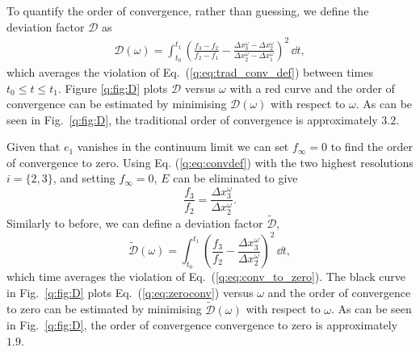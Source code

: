 To quantify the order of convergence, rather than guessing, we define the deviation factor $\mathcal{D}$ as
\begin{align}\label{q:eq:tradconv}
\mathcal{D}(\omega) = \int_{t_0}^{t_1}\left(\frac{f_3-f_2}{f_2-f_1} - \frac{ \Delta x_3^\omega-\Delta x_2^\omega }{ \Delta x_2^\omega-\Delta x_1^\omega }\right)^2\,\dd t,
\end{align}
which averages the violation of Eq.~(\ref{q:eq:trad_conv_def}) between times $t_0\leq t\leq t_1$. Figure \ref{q:fig:D} plots $\mathcal{D}$ versus $\omega$ with a red curve and the order of convergence can be estimated by minimising $\mathcal{D}(\omega)$ with respect to $\omega$. As can be seen in Fig.~\ref{q:fig:D}, the traditional order of convergence is approximately $3.2$.

Given that $e_1$ vanishes in the continuum limit we can set $f_\infty=0$ to find the order of convergence to zero. Using Eq. (\ref{q:eq:convdef}) with the two highest resolutions $i=\{2,3\}$, and setting $f_\infty=0$, $E$ can be eliminated to give
\begin{equation}\label{q:eq:conv_to_zero}
\frac{f_3}{f_2} = \frac{\Delta x_3^\omega}{\Delta x_2^\omega}.
\end{equation}
Similarly to before, we can define a deviation factor $\tilde{\mathcal{D}}$,
\begin{equation}\label{q:eq:zeroconv}
\tilde{\mathcal{D}}(\omega) = \int_{t_0}^{t_1}\left(\frac{f_3}{f_2} - \frac{\Delta x_3^\omega}{\Delta x_2^\omega}\right)^2\,\dd t,
\end{equation}
which time averages the violation of Eq.~(\ref{q:eq:conv_to_zero}). The black curve in Fig.~\ref{q:fig:D} plots Eq.~(\ref{q:eq:zeroconv}) versus $\omega$ and the order of convergence to zero can be estimated by minimising $\tilde{\mathcal{D}}(\omega)$ with respect to $\omega$. As can be seen in Fig.~\ref{q:fig:D}, the order of convergence convergence to zero is approximately $1.9$.
